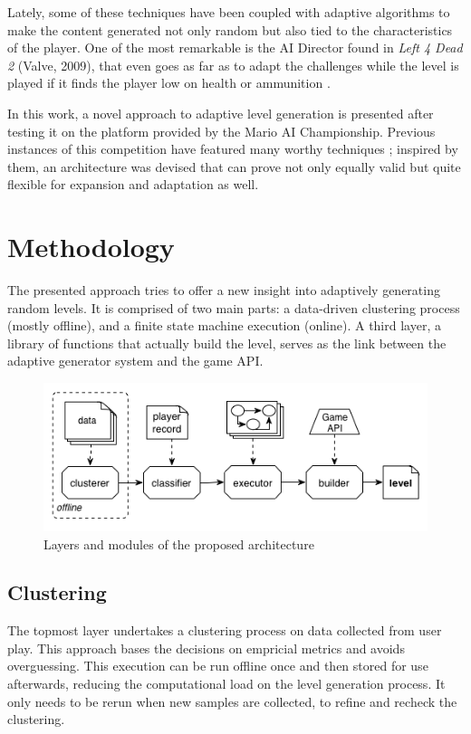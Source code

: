 \documentclass[conference]{IEEEtran}
\begin{document}
Lately, some of these techniques have been coupled with adaptive algorithms to make the content generated not only random but also tied to the characteristics of the player. One of the most remarkable is the AI Director found in \textit{Left 4 Dead 2} (Valve, 2009), that even goes as far as to adapt the challenges while the level is played if it finds the player low on health or ammunition \cite{l4d09}.

In this work, a novel approach to adaptive level generation is presented after testing it on the platform provided by the Mario AI Championship. Previous instances of this competition have featured many worthy techniques \cite{mario2010}; inspired by them, an architecture was devised that can prove not only equally valid but quite flexible for expansion and adaptation as well.

\section{Methodology}

The presented approach tries to offer a new insight into adaptively generating random levels. It is comprised of two main parts: a data-driven clustering process (mostly offline), and a finite state machine execution (online). A third layer, a library of functions that actually build the level, serves as the link between the adaptive generator system and the game API. 

\begin{figure}[htp]
\centerline{\includegraphics[width=1.2\columnwidth]{layers.png}}
\caption{Layers and modules of the proposed architecture}
\label{layers}
\end{figure}

\subsection{Clustering}

The topmost layer undertakes a clustering process on data collected from user play. This approach bases the decisions on empricial metrics and avoids overguessing. This execution can be run offline once and then stored for use afterwards, reducing the computational load on the level generation process. It only needs to be rerun when new samples are collected, to refine and recheck the clustering.
\end{document}
